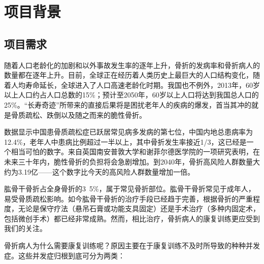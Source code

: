 \documentclass[UTF8]{ctexart}
\begin{document}
\section{项目背景}
    \subsection{项目需求}
        随着人口老龄化的加剧和以外事故发生率的逐年上升，骨折的发病率和骨折病人的数量都在逐年上升。目前，全球正在经历着人类历史上最巨大的人口结构变化，随着人均寿命延长，全球进入了人口高速老龄化时期。我国也不例外，2013年，60岁以上人口约占人口总数的15\%；预计至2050年，60岁以上人口将达到我国总人口的25\%。“长寿奇迹”所带来的直接后果将是困扰老年人的疾病的爆发，首当其冲的就是骨质疏松、跌倒以及随之而来的脆性骨折。
        
        数据显示中国患骨质疏松症已跃居常见病多发病的第七位，中国内地总患病率为12.4\%，老年人中患病比例超过一半以上，其中骨折发生率接近1/3，这已经是一个相当可怕的数字。来自英国南安普敦大学和谢菲尔德医学院的一项研究表明，在未来三十年内，脆性骨折的负担将会急剧增加。到2040年，骨折高风险人群数量大约为3.19亿——这个数字比今天的高风险人群数量增加一倍。
        
        肱骨干骨折占全身骨折的3~5\%，属于常见骨折部位。肱骨干骨折常见于成年人，易受骨质疏松影响。如今肱骨干骨折的治疗手段已经趋于完善，根据骨折的严重程度，无论是保守疗法（悬吊石膏或功能支具固定）还是手术治疗（多种内固定术，包括微创手术）\cite{Ref1}都已经非常成熟。然而，相比治疗，骨折病人的康复训练更应受到我们的关注。
        
        骨折病人为什么需要康复训练呢？原因主要在于康复训练不及时所导致的种种并发症。这些并发症归根到底可分为两类：
\end{document}
